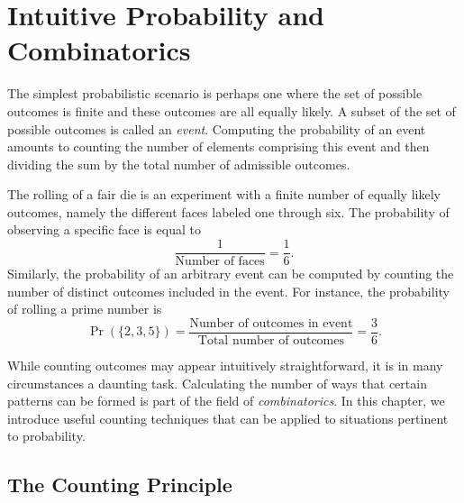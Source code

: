 \chapter{Intuitive Probability and Combinatorics}

The simplest probabilistic scenario is perhaps one where the set of possible outcomes is finite and these outcomes are all equally likely.
A subset of the set of possible outcomes is called an \emph{event}.
Computing the probability of an event amounts to counting the number of elements comprising this event and then dividing the sum by the total number of admissible outcomes.

\begin{example}
The rolling of a fair die is an experiment with a finite number of equally likely outcomes, namely the different faces labeled one through six.
The probability of observing a specific face is equal to
\begin{equation*}
\frac{1}{\text{Number of faces}} = \frac{1}{6} .
\end{equation*}
Similarly, the probability of an arbitrary event can be computed by counting the number of distinct outcomes included in the event.
For instance, the probability of rolling a prime number is
\begin{equation*}
\Pr ( \{ 2, 3, 5 \} )
= \frac{\text{Number of outcomes in event}}{\text{Total number of outcomes}}
= \frac{3}{6} .
\end{equation*}
\end{example}

While counting outcomes may appear intuitively straightforward, it is in many circumstances a daunting task.
Calculating the number of ways that certain patterns can be formed is part of the field of \emph{combinatorics}. 
In this chapter, we introduce useful counting techniques that can be applied to situations pertinent to probability.


\section{The Counting Principle}

